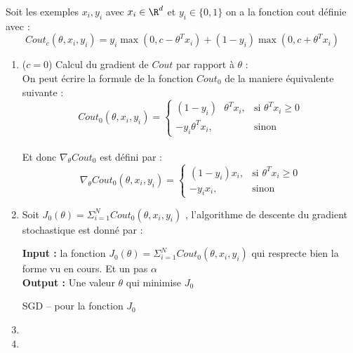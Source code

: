 \documentclass[12pt]{article}
\begin{document}
Soit les exemples $x_i,y_i$ avec $x_i \in \R^d$ et $y_i \in \{0,1\}$ on a la fonction cout définie avec :
\begin{equation}
    Cout_c(\theta,x_i,y_i) = y_i \max(0,c-\theta^Tx_i) + (1-y_i) \max(0,c+\theta^Tx_i)
    \label{eq:e1}
\end{equation}
\begin{enumerate}[1)]
    \item ($c=0$) Calcul du gradient de $Cout$ par rapport à $\theta$ : 
     \\
     On peut écrire la formule de la fonction $Cout_0$ de la maniere équivalente suivante :
     $$
     Cout_0(\theta,x_i,y_i) =
     \begin{cases}
         (1-y_i)\mbox{ }\theta^Tx_i, & \mbox{si } \theta^Tx_i \geq 0 \\
         -y_i\theta^Tx_i, & \mbox{sinon } 
     \end{cases}
     $$\\
     Et donc $\nabla_\theta Cout_0$ est défini par : 
          $$
     \nabla_\theta Cout_0(\theta,x_i,y_i) =
     \begin{cases}
         (1-y_i) x_i, & \mbox{si } \theta^Tx_i \geq 0 \\
         -y_i x_i, & \mbox{sinon } 
     \end{cases}
     $$
     \item Soit $J_0(\theta) = \Sigma_{i=1}^N Cout_0(\theta,x_i,y_i)$ , l'algorithme de descente du gradient stochastique est donné par : \\
    \begin{algorithm}[H]
    \SetAlgoLined
     \textbf{Input :} la fonction $J_0(\theta) = \Sigma_{i=1}^N Cout_0(\theta,x_i,y_i)$ qui resprecte bien la forme vu en cours. Et un pas $\alpha$ \\
    \textbf{Output :} Une valeur $\theta$ qui minimise $J_0$\\
      \caption{SGD -- pour la fonction $J_0$}
    \end{algorithm}\leavevmode\newline 
    \clearpage
    \item
    \item 
    
\end{enumerate}
\end{document}
